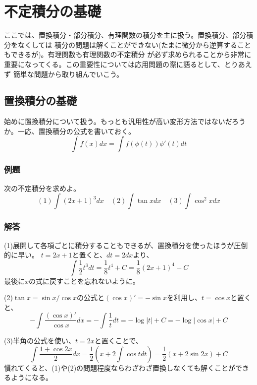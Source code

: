 \documentclass[a4j,dvipdfmx]{jsarticle}
\begin{document}
\newpage

\section{不定積分の基礎}
ここでは、置換積分・部分積分、有理関数の積分を主に扱う。置換積分、部分積分をなくしては
積分の問題は解くことができない(たまに微分から逆算することもできるが)。有理関数も有理関数の不定積分
が必ず求められることから非常に重要になってくる。この重要性については応用問題の際に語るとして、とりあえず
簡単な問題から取り組んでいこう。
\subsection{置換積分の基礎}
始めに置換積分について扱う。もっとも汎用性が高い変形方法ではないだろうか。一応、置換積分の公式を書いておく。
\begin{equation*}
    \int f(x)dx = \int f(\phi(t))\phi'(t)dt
\end{equation*}
\subsubsection{例題}
次の不定積分を求めよ。
\begin{equation*}
    (1)\int (2x+1)^3 dx \quad (2)\int\tan x dx \quad (3)\int\cos^2 xdx
\end{equation*}
\subsubsection*{解答}
(1)展開して各項ごとに積分することもできるが、置換積分を使ったほうが圧倒的に早い。
$t=2x+1$と置くと、$dt=2dx$より、
\begin{equation*}
    \int \frac{1}{2}t^3dt=\frac{1}{8}t^4+C =\frac{1}{8}(2x+1)^4+C
\end{equation*}
最後に$x$の式に戻すことを忘れないように。

(2)$\tan x=\sin x/\cos x$の公式と$(\cos x)'=-\sin x$を利用し、$t=\cos x$と置くと、
\begin{equation*}
    -\int \frac{(\cos x)'}{\cos x}dx=-\int \frac{1}{t}dt=-\log |t|+C=-\log|\cos x|+C
\end{equation*}

(3)半角の公式を使い、$t=2x$と置くことで、
\begin{equation*}
    \int \frac{1+\cos 2x}{2}dx=\frac{1}{2}(x+2\int \cos tdt)=\frac{1}{2}(x+2\sin 2x)+C
\end{equation*}
慣れてくると、(1)や(2)の問題程度ならわざわざ置換しなくても解くことができるようになる。
\end{document}
